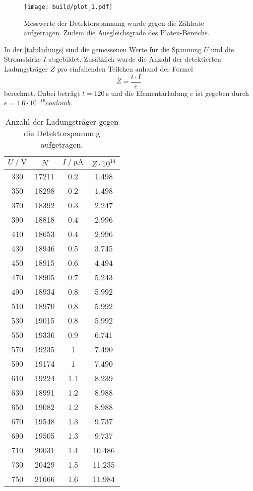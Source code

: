 \begin{figure}[H]
	\texttt{[image: build/plot\_1.pdf]}
	\caption{Messwerte der Detektorspannung wurde gegen die Zählrate aufgetragen. Zudem die Ausgleichsgrade des Plateu-Bereichs.}
	\label{fig:plot_1}
\end{figure}

In der \autoref{tab:ladungs} sind die gemessenen Werte für die  Spannung $U$ und die Stromstärke $I$ abgebildet.
Zusätzlich wurde die Anzahl der detektierten Ladungsträger $Z$ pro einfallenden Teilchen anhand der Formel
\begin{equation*}
    Z = \frac{t \cdot I}{e}
\end{equation*}
berechnet. Dabei beträgt $t = \SI{120}{\second}$ und die Elementarladung $e$ ist gegeben durch $e = 1.6 \cdot 10^{-19} \si{coulomb}$.

\begin{table}[H]
    \centering
    \caption{Anzahl der Ladungsträger gegen die Detektorspannung aufgetragen.}
    \label{tab:ladungs}
\begin{tabular}{c c c c}
    \toprule
    $U \mathbin{/} \mathrm{V}$ & $N$ &  $I \mathbin{/} \unit{\micro\ampere}$ & $Z \cdot 10^{14}$\\
    \midrule
         330 &    17211 &   0.2 & 1.498\\
         350 &    18298 &   0.2 & 1.498\\
         370 &    18392 &   0.3 & 2.247\\
         390 &    18818 &   0.4 & 2.996\\
         410 &    18653 &   0.4 & 2.996\\
         430 &    18946 &   0.5 & 3.745\\
         450 &    18915 &   0.6 & 4.494\\
         470 &    18905 &   0.7 & 5.243\\
         490 &    18934 &   0.8 & 5.992\\
         510 &    18970 &   0.8 & 5.992\\
         530 &    19015 &   0.8 & 5.992\\
         550 &    19336 &   0.9 & 6.741\\
         570 &    19235 &     1 & 7.490\\
         590 &    19174 &     1 & 7.490\\
         610 &    19224 &   1.1 & 8.239\\
         630 &    18991 &   1.2 & 8.988\\
         650 &    19082 &   1.2 & 8.988\\
         670 &    19548 &   1.3 & 9.737\\
         690 &    19505 &   1.3 & 9.737\\
         710 &    20031 &   1.4 & 10.486\\
         730 &    20429 &   1.5 & 11.235\\
         750 &    21666 &   1.6 & 11.984\\
    \bottomrule
    \end{tabular}
\end{table}

